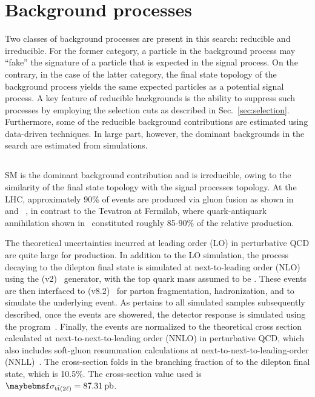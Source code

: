 \chapter{Background processes}
\label{chap:backgrounds}

Two classes of background processes are present in this search: reducible and irreducible. For the former category, a particle in the background process may ``fake'' the signature of a particle that is expected in the signal process. On the contrary, in the case of the latter category, the final state topology of the background process yields the same expected particles as a potential signal process. A key feature of reducible backgrounds is the ability to suppress such processes by employing the selection cuts as described in Sec.~\ref{sec:selection}. Furthermore, some of the reducible background contributions are estimated using data-driven techniques. In large part, however, the dominant backgrounds in the search are estimated from simulations.
\section{\ttll}

SM \ttll is the dominant background contribution and is irreducible, owing to the similarity of the final state topology with the signal processes topology. At the LHC, approximately 90\% of \ttbar events are produced via gluon fusion as shown in~ and ~, in contrast to the Tevatron at Fermilab, where quark-antiquark annihilation shown in~ constituted roughly 85-90\% of the relative \ttbar production. 

The theoretical uncertainties incurred at leading order (LO) in perturbative QCD are quite large for \ttbar production. In addition to the LO simulation, the \ttbar process decaying to the dilepton final state is simulated at next-to-leading order (NLO) using the \POWHEG (v2)~\cite{powheg,powheg2} generator, with the top quark mass assumed to be \:\GeV. These events are then interfaced to \Pythia (v8.2)~\cite{Sjostrand:2014zea} for parton fragmentation, hadronization, and to simulate the underlying event. As pertains to all simulated samples subsequently described, once the \ttll events are showered, the detector response is simulated using the  program~\cite{AGOSTINELLI2003250}. Finally, the \ttll events are normalized to the theoretical cross section calculated at next-to-next-to-leading order (NNLO) in perturbative QCD, which also includes soft-gluon resummation calculations at next-to-next-to-leading-order (NNLL)~\cite{ttxsec1,ttxsec2,ttxsec3,ttxsec4,ttxsec5}. The cross-section folds in the branching fraction of \ttbar to the dilepton final state, which is 10.5\%. The cross-section value used is $\sigma_{\ttll}=87.31\:\mathrm{pb}$.

